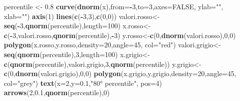 \documentclass[a4paper,12pt,oneside]{book}
\newenvironment{Shaded}{\begin{snugshade}}{\end{snugshade}}
\newcommand{\KeywordTok}[1]{\textcolor[rgb]{0.13,0.29,0.53}{\textbf{#1}}}
\newcommand{\DataTypeTok}[1]{\textcolor[rgb]{0.13,0.29,0.53}{#1}}
\newcommand{\DecValTok}[1]{\textcolor[rgb]{0.00,0.00,0.81}{#1}}
\newcommand{\FloatTok}[1]{\textcolor[rgb]{0.00,0.00,0.81}{#1}}
\newcommand{\StringTok}[1]{\textcolor[rgb]{0.31,0.60,0.02}{#1}}
\newcommand{\OtherTok}[1]{\textcolor[rgb]{0.56,0.35,0.01}{#1}}
\newcommand{\OperatorTok}[1]{\textcolor[rgb]{0.81,0.36,0.00}{\textbf{#1}}}
\newcommand{\NormalTok}[1]{#1}
\begin{document}
\begin{Shaded}
\begin{Highlighting}[]
\NormalTok{percentile <-}\StringTok{ }\FloatTok{0.8}
\KeywordTok{curve}\NormalTok{(}\KeywordTok{dnorm}\NormalTok{(x),}\DataTypeTok{from=}\OperatorTok{-}\DecValTok{3}\NormalTok{,}\DataTypeTok{to=}\DecValTok{3}\NormalTok{,}\DataTypeTok{axes=}\OtherTok{FALSE}\NormalTok{, }\DataTypeTok{ylab=}\StringTok{""}\NormalTok{, }\DataTypeTok{xlab=}\StringTok{""}\NormalTok{)}
\KeywordTok{axis}\NormalTok{(}\DecValTok{1}\NormalTok{)}
\KeywordTok{lines}\NormalTok{(}\KeywordTok{c}\NormalTok{(}\OperatorTok{-}\DecValTok{3}\NormalTok{,}\DecValTok{3}\NormalTok{),}\KeywordTok{c}\NormalTok{(}\DecValTok{0}\NormalTok{,}\DecValTok{0}\NormalTok{))}
\NormalTok{valori.rosso<-}\KeywordTok{seq}\NormalTok{(}\OperatorTok{-}\DecValTok{3}\NormalTok{,}\KeywordTok{qnorm}\NormalTok{(percentile),}\DataTypeTok{length=}\DecValTok{100}\NormalTok{)}
\NormalTok{x.rosso<-}\KeywordTok{c}\NormalTok{(}\OperatorTok{-}\DecValTok{3}\NormalTok{,valori.rosso,}\KeywordTok{qnorm}\NormalTok{(percentile),}\OperatorTok{-}\DecValTok{3}\NormalTok{)}
\NormalTok{y.rosso<-}\KeywordTok{c}\NormalTok{(}\DecValTok{0}\NormalTok{,}\KeywordTok{dnorm}\NormalTok{(valori.rosso),}\DecValTok{0}\NormalTok{,}\DecValTok{0}\NormalTok{)}
\KeywordTok{polygon}\NormalTok{(x.rosso,y.rosso,}\DataTypeTok{density=}\DecValTok{20}\NormalTok{,}\DataTypeTok{angle=}\DecValTok{45}\NormalTok{, }\DataTypeTok{col=}\StringTok{"red"}\NormalTok{)}
\NormalTok{valori.grigio<-}\KeywordTok{seq}\NormalTok{(}\KeywordTok{qnorm}\NormalTok{(percentile),}\DecValTok{3}\NormalTok{,}\DataTypeTok{length=}\DecValTok{100}\NormalTok{)}
\NormalTok{x.grigio<-}\KeywordTok{c}\NormalTok{(}\KeywordTok{qnorm}\NormalTok{(percentile),valori.grigio,}\DecValTok{3}\NormalTok{,}\KeywordTok{qnorm}\NormalTok{(percentile))}
\NormalTok{y.grigio<-}\KeywordTok{c}\NormalTok{(}\DecValTok{0}\NormalTok{,}\KeywordTok{dnorm}\NormalTok{(valori.grigio),}\DecValTok{0}\NormalTok{,}\DecValTok{0}\NormalTok{)}
\KeywordTok{polygon}\NormalTok{(x.grigio,y.grigio,}\DataTypeTok{density=}\DecValTok{20}\NormalTok{,}\DataTypeTok{angle=}\DecValTok{45}\NormalTok{, }\DataTypeTok{col=}\StringTok{"grey"}\NormalTok{)}
\KeywordTok{text}\NormalTok{(}\DataTypeTok{x=}\DecValTok{2}\NormalTok{,}\DataTypeTok{y=}\FloatTok{0.1}\NormalTok{,}\StringTok{"80° percentile"}\NormalTok{, }\DataTypeTok{pos=}\DecValTok{4}\NormalTok{)}
\KeywordTok{arrows}\NormalTok{(}\DecValTok{2}\NormalTok{,}\FloatTok{0.1}\NormalTok{,}\KeywordTok{qnorm}\NormalTok{(percentile),}\DecValTok{0}\NormalTok{)}
\end{Highlighting}
\end{Shaded}
\end{document}
